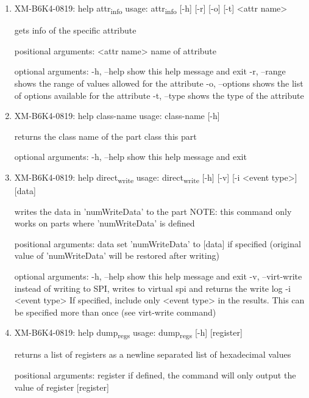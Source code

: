 \documentclass[11pt]{article}
\begin{document}
\begin{enumerate}
\item XM-B6K4-0819: help attr\textsubscript{info}
\label{sec:orge241c99}
usage: attr\textsubscript{info} [-h] [-r] [-o] [-t] <attr name>

gets info of the specific attribute

positional arguments:
  <attr name>    name of attribute

optional arguments:
  -h, --help     show this help message and exit
  -r, --range    shows the range of values allowed for the attribute
  -o, --options  shows the list of options available for the attribute
  -t, --type     shows the type of the attribute

\item XM-B6K4-0819: help class-name
\label{sec:org7c29461}
usage: class-name [-h]

returns the class name of the part class this part

optional arguments:
  -h, --help  show this help message and exit

\item XM-B6K4-0819: help direct\textsubscript{write}
\label{sec:org7d0a355}
usage: direct\textsubscript{write} [-h] [-v] [-i <event type>] [data]

writes the data in 'numWriteData' to the part NOTE: this command only works on
parts where 'numWriteData' is defined

positional arguments:
  data              set 'numWriteData' to [data] if specified (original value
                    of 'numWriteData' will be restored after writing)

optional arguments:
  -h, --help        show this help message and exit
  -v, --virt-write  instead of writing to SPI, writes to virtual spi and
                    returns the write log
  -i <event type>   If specified, include only <event type> in the results.
                    This can be specified more than once (see virt-write
                    command)

\item XM-B6K4-0819: help dump\textsubscript{regs}
\label{sec:org8183f57}
usage: dump\textsubscript{regs} [-h] [register]

returns a list of registers as a newline separated list of hexadecimal values

positional arguments:
  register    if defined, the command will only output the value of register
              [register]


\end{enumerate}
\end{document}
